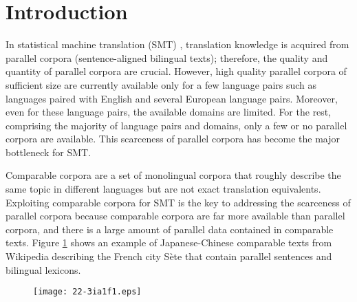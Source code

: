\documentclass[english]{jnlp_1.4}
\begin{document}
\maketitle



\section{Introduction}
In statistical machine translation (SMT) \cite{brown-EtAl:1993,Och:2003:SCV:778822.778824,Koehn:2010:SMT:1734086}, 
translation knowledge is acquired from parallel corpora (sentence-aligned bilingual texts);
therefore, the quality and quantity of
parallel corpora are crucial. However, high quality parallel corpora of sufficient size are currently
available only for a few language pairs such as languages paired with English and several 
European language pairs. Moreover, even for these language pairs, the available domains are 
limited. For the rest, comprising the majority of language pairs and domains, only a few or no parallel 
corpora are available. This scarceness of parallel corpora has become the major bottleneck for SMT.

Comparable corpora are a set of monolingual corpora that roughly describe the same 
topic in different languages but are not exact translation equivalents. 
Exploiting comparable corpora for SMT is the key to addressing the 
scarceness of parallel corpora because
comparable corpora are far more available than parallel corpora, and 
there is a large amount of parallel data contained in comparable texts.
Figure \ref{fig:wiki} shows an example of Japanese-Chinese comparable texts 
from Wikipedia describing the French city S\`ete that contain parallel sentences 
and bilingual lexicons.

\begin{figure}[b]
\begin{center}
\texttt{[image: 22-3ia1f1.eps]}
\end{center}
\label{fig:wiki}
\end{figure}
\end{document}
